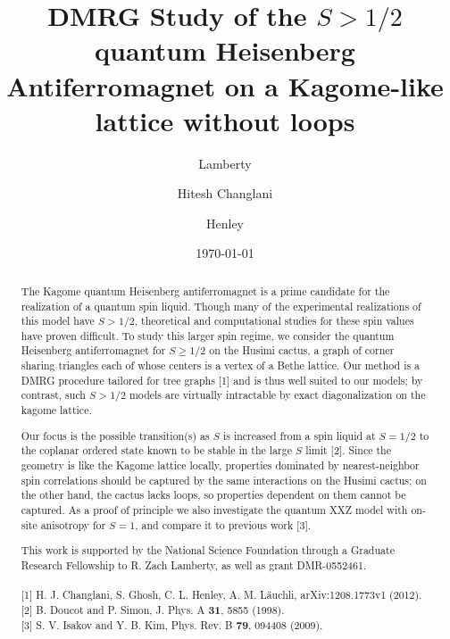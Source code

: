 \documentclass[aps]{revtex4-1}
\begin{document}
\title{DMRG Study of the $S>1/2$ quantum Heisenberg Antiferromagnet on a Kagome-like lattice without loops}
\date{\today}

\author{ Lamberty}
\author{Hitesh Changlani}
\author{ Henley}

\begin{abstract}
The Kagome quantum Heisenberg antiferromagnet is a prime candidate for the realization of a quantum spin liquid. Though many of the experimental realizations of this model have $S>1/2$, theoretical and computational studies for these spin values have proven difficult. To study this larger spin regime, we consider the quantum Heisenberg antiferromagnet for $S\ge1/2$ on the Husimi cactus, a graph of corner sharing triangles each of whose centers is a vertex of a Bethe lattice. Our method is a DMRG procedure tailored for tree graphs $[$1$]$ and is thus well suited to our models; by contrast, such $S>1/2$ models are virtually intractable by exact diagonalization on the kagome lattice.

Our focus is the possible transition(s) as $S$ is increased from a spin liquid at $S=1/2$ to the coplanar ordered state known to be stable in the large $S$ limit $[$2$]$. Since the geometry is like the Kagome lattice locally, properties dominated by nearest-neighbor spin correlations should be captured by the same interactions on the Husimi cactus; on the other hand, the cactus lacks loops, so properties dependent on them cannot be captured.  As a proof of principle we also investigate the quantum XXZ model with on-site anisotropy for $S=1$, and compare it to previous work $[$3$]$.

This work is supported by the National Science Foundation through a Graduate Research Fellowship to R. Zach Lamberty, as well as grant DMR-0552461.\\
\\
\noindent
$[$1$]$ H. J. Changlani, S. Ghosh, C. L. Henley, A. M. L\"{a}uchli, arXiv:1208.1773v1 (2012).\\
$[$2$]$ B. Doucot and P. Simon, J. Phys. A \textbf{31}, 5855 (1998).\\
$[$3$]$ S. V. Isakov and Y. B. Kim, Phys. Rev. B \textbf{79}, 094408 (2009).\\

\end{abstract}
\maketitle
\end{document}
